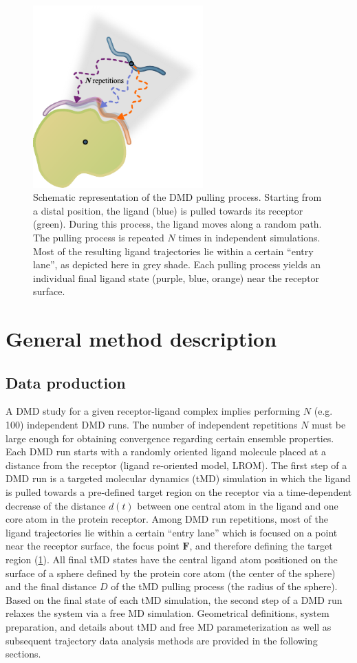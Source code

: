 \begin{figure}
\centering
\includegraphics[height=7cm]{gfx/dmd/scheme_n_repetitions_for_thesis_002.pdf}
\caption[]{Schematic representation of the DMD pulling process. Starting from a
distal position, the ligand (blue) is pulled towards its receptor (green).
During this process, the ligand moves along a random path. The pulling process
is repeated $N$ times in independent simulations. Most of the resulting ligand
trajectories lie within a certain \enquote{entry lane}, as depicted here in grey
shade. Each pulling process yields an individual final ligand state (purple,
blue, orange) near the receptor surface.}
\label{fig:dmd:n_repetitions}
\end{figure}


\section{General method description}
\subsection{Data production}

A DMD study for a given receptor-ligand complex implies performing $N$ (e.g.
100) independent DMD runs. The number of independent repetitions $N$ must be
large enough for obtaining convergence regarding certain ensemble properties.
Each DMD run starts with a randomly oriented ligand molecule placed at a
distance from the receptor (ligand re-oriented model, LROM). The first step of a
DMD run is a targeted molecular dynamics (tMD) simulation in which the ligand is
pulled towards a pre-defined target region on the receptor via a time-dependent
decrease of the distance $d(t)$ between one central atom in the ligand and one
core atom in the protein receptor. Among DMD run repetitions, most of the ligand
trajectories lie within a certain \enquote{entry lane} which is focused on a
point near the receptor surface, the focus point $\bm{F}$, and therefore
defining the target region (\cref{fig:dmd:n_repetitions}). All final tMD states
have the central ligand atom positioned on the surface of a sphere defined by
the protein core atom (the center of the sphere) and the final distance $D$ of
the tMD pulling process (the radius of the sphere). Based on the final state of
each tMD simulation, the second step of a DMD run relaxes the system via a free
MD simulation. Geometrical definitions, system preparation, and details about
tMD and free MD parameterization as well as subsequent trajectory data analysis
methods are provided in the following sections.

